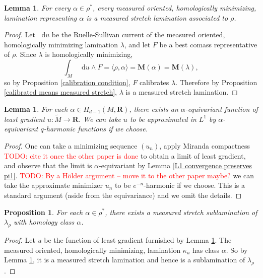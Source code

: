 \documentclass[reqno,11pt]{amsart}
\newcommand{\RR}{\mathbf{R}}
\newcommand*\dif{\mathop{}\!\mathrm{d}}
\newcommand{\Mass}{\mathbf M}
\newtheorem{lemma}[theorem]{Lemma}
\newtheorem{proposition}[theorem]{Proposition}
\theoremstyle{definition}
\numberwithin{equation}{section}
\newcommand\todo[1]{\textcolor{red}{TODO: #1}}
\begin{document}
\begin{lemma}\label{homologically minimizing means measured stretch}
For every $\alpha \in \rho^*$, every measured oriented, homologically minimizing, lamination representing $\alpha$ is a measured stretch lamination associated to $\rho$.
\end{lemma}
\begin{proof}
Let $\dif u$ be the Ruelle-Sullivan current of the measured oriented, homologically minimizing lamination $\lambda$, and let $F$ be a best comass representative of $\rho$.
Since $\lambda$ is homologically minimizing,
$$\int_M \dif u \wedge F = \langle \rho, \alpha\rangle = \Mass(\alpha) = \Mass(\lambda),$$
so by Proposition \ref{calibration condition}, $F$ calibrates $\lambda$.
Therefore by Proposition \ref{calibrated means measured stretch}, $\lambda$ is a measured stretch lamination.
\end{proof}

\begin{lemma}\label{existence for least gradient}
For each $\alpha \in H_{d - 1}(M, \RR)$, there exists an $\alpha$-equivariant function of least gradient $u: \tilde M \to \RR$.
We can take $u$ to be approximated in $L^1$ by $\alpha$-equivariant $q$-harmonic functions if we choose.
\end{lemma}
\begin{proof}
One can take a minimizing sequence $(u_n)$, apply Miranda compactness \todo{cite it once the other paper is done} to obtain a limit of least gradient, and observe that the limit is $\alpha$-equivariant by Lemma \ref{L1 convergence preserves pi1}.
\todo{By a H\"older argument -- move it to the other paper maybe?} we can take the approximate minimizer $u_n$ to be $e^{-n}$-harmonic if we choose.
This is a standard argument (aside from the equivariance) and we omit the details.
\end{proof}

\begin{proposition}\label{enough measures in canonical lamination}
For each $\alpha \in \rho^*$, there exists a measured stretch sublamination of $\lambda_\rho$ with homology class $\alpha$.
\end{proposition}
\begin{proof}
Let $u$ be the function of least gradient furnished by Lemma \ref{existence for least gradient}.
The measured oriented, homologically minimizing, lamination $\kappa_u$ has class $\alpha$.
So by Lemma \ref{homologically minimizing means measured stretch}, it is a measured stretch lamination and hence is a sublamination of $\lambda_\rho$.
\end{proof}
\end{document}

